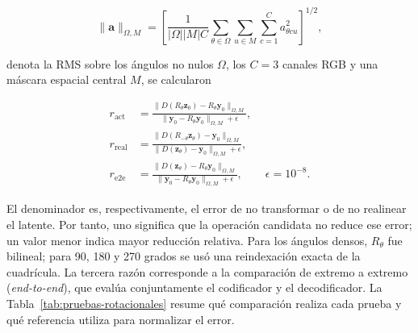 \begin{equation}
    \lVert\mathbf a\rVert_{\Omega,M}
    =\left[\frac{1}{|\Omega||M|C}
      \sum_{\theta\in\Omega}\sum_{u\in M}\sum_{c=1}^{C}
      a_{\theta c u}^{2}\right]^{1/2},
    \label{eq:norma-rms-orbita}
\end{equation}

denota la RMS sobre los ángulos no nulos \(\Omega\), los \(C=3\) canales RGB y
una máscara espacial central \(M\), se calcularon

\begin{equation}
\begin{aligned}
    r_{\mathrm{act}}
      &=\frac{\lVert D(R_\theta\mathbf z_0)-R_\theta\mathbf y_0
          \rVert_{\Omega,M}}
        {\lVert\mathbf y_0-R_\theta\mathbf y_0\rVert_{\Omega,M}+\epsilon},\\
    r_{\mathrm{real}}
      &=\frac{\lVert D(R_{-\theta}\mathbf z_\theta)-\mathbf y_0
          \rVert_{\Omega,M}}
        {\lVert D(\mathbf z_\theta)-\mathbf y_0\rVert_{\Omega,M}+\epsilon},\\
    r_{\mathrm{e2e}}
      &=\frac{\lVert D(\mathbf z_\theta)-R_\theta\mathbf y_0
          \rVert_{\Omega,M}}
        {\lVert\mathbf y_0-R_\theta\mathbf y_0\rVert_{\Omega,M}+\epsilon},
        \qquad \epsilon=10^{-8}.
\end{aligned}
\label{eq:razones-transformacion-latente}
\end{equation}

\begingroup{}
El denominador es, respectivamente, el error de no transformar o de no
realinear el latente. Por tanto, uno significa que la operación candidata no
reduce ese error; un valor menor indica mayor reducción relativa. Para los
ángulos densos, \(R_\theta\) fue
bilineal; para 90, 180 y 270 grados se usó una reindexación exacta de la
cuadrícula. La tercera razón corresponde a la comparación de extremo a extremo (\emph{end-to-end}), que evalúa conjuntamente el codificador y el decodificador. La Tabla~\ref{tab:pruebas-rotacionales} resume qué comparación
realiza cada prueba y qué referencia utiliza para normalizar el error.
\par\endgroup

